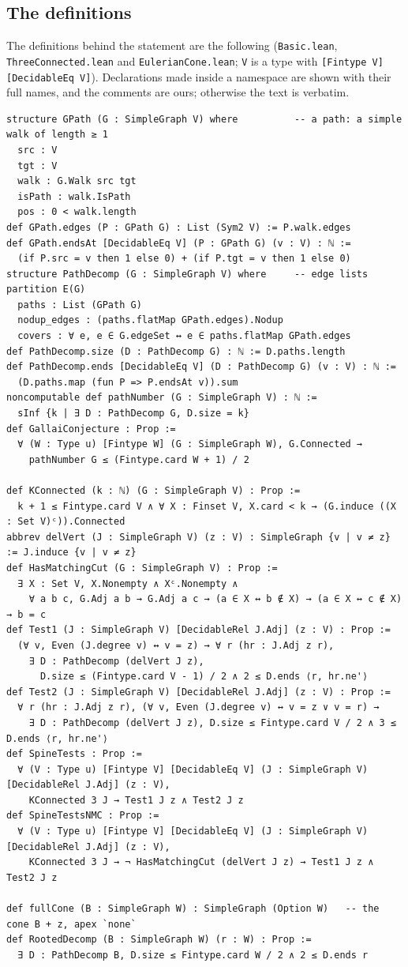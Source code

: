 \documentclass[11pt]{amsart}
\theoremstyle{definition}
\theoremstyle{remark}
\renewcommand{\_}{\oldunderscore\allowbreak}
\begin{document}
\subsection{The definitions}
The definitions behind the statement are the following (\texttt{Basic.lean},
\texttt{ThreeConnected.lean} and \texttt{EulerianCone.lean}; \texttt{V} is a type with
\texttt{[Fintype V] [DecidableEq V]}). Declarations made inside a namespace are shown with their
full names, and the comments are ours; otherwise the text is verbatim.
{\footnotesize
\begin{verbatim}
structure GPath (G : SimpleGraph V) where          -- a path: a simple walk of length ≥ 1
  src : V
  tgt : V
  walk : G.Walk src tgt
  isPath : walk.IsPath
  pos : 0 < walk.length
def GPath.edges (P : GPath G) : List (Sym2 V) := P.walk.edges
def GPath.endsAt [DecidableEq V] (P : GPath G) (v : V) : ℕ :=
  (if P.src = v then 1 else 0) + (if P.tgt = v then 1 else 0)
structure PathDecomp (G : SimpleGraph V) where     -- edge lists partition E(G)
  paths : List (GPath G)
  nodup_edges : (paths.flatMap GPath.edges).Nodup
  covers : ∀ e, e ∈ G.edgeSet ↔ e ∈ paths.flatMap GPath.edges
def PathDecomp.size (D : PathDecomp G) : ℕ := D.paths.length
def PathDecomp.ends [DecidableEq V] (D : PathDecomp G) (v : V) : ℕ :=
  (D.paths.map (fun P => P.endsAt v)).sum
noncomputable def pathNumber (G : SimpleGraph V) : ℕ :=
  sInf {k | ∃ D : PathDecomp G, D.size = k}
def GallaiConjecture : Prop :=
  ∀ (W : Type u) [Fintype W] (G : SimpleGraph W), G.Connected →
    pathNumber G ≤ (Fintype.card W + 1) / 2

def KConnected (k : ℕ) (G : SimpleGraph V) : Prop :=
  k + 1 ≤ Fintype.card V ∧ ∀ X : Finset V, X.card < k → (G.induce ((X : Set V)ᶜ)).Connected
abbrev delVert (J : SimpleGraph V) (z : V) : SimpleGraph {v | v ≠ z} := J.induce {v | v ≠ z}
def HasMatchingCut (G : SimpleGraph V) : Prop :=
  ∃ X : Set V, X.Nonempty ∧ Xᶜ.Nonempty ∧
    ∀ a b c, G.Adj a b → G.Adj a c → (a ∈ X ↔ b ∉ X) → (a ∈ X ↔ c ∉ X) → b = c
def Test1 (J : SimpleGraph V) [DecidableRel J.Adj] (z : V) : Prop :=
  (∀ v, Even (J.degree v) ↔ v = z) → ∀ r (hr : J.Adj z r),
    ∃ D : PathDecomp (delVert J z),
      D.size ≤ (Fintype.card V - 1) / 2 ∧ 2 ≤ D.ends ⟨r, hr.ne'⟩
def Test2 (J : SimpleGraph V) [DecidableRel J.Adj] (z : V) : Prop :=
  ∀ r (hr : J.Adj z r), (∀ v, Even (J.degree v) ↔ v = z ∨ v = r) →
    ∃ D : PathDecomp (delVert J z), D.size ≤ Fintype.card V / 2 ∧ 3 ≤ D.ends ⟨r, hr.ne'⟩
def SpineTests : Prop :=
  ∀ (V : Type u) [Fintype V] [DecidableEq V] (J : SimpleGraph V) [DecidableRel J.Adj] (z : V),
    KConnected 3 J → Test1 J z ∧ Test2 J z
def SpineTestsNMC : Prop :=
  ∀ (V : Type u) [Fintype V] [DecidableEq V] (J : SimpleGraph V) [DecidableRel J.Adj] (z : V),
    KConnected 3 J → ¬ HasMatchingCut (delVert J z) → Test1 J z ∧ Test2 J z

def fullCone (B : SimpleGraph W) : SimpleGraph (Option W)   -- the cone B + z, apex `none`
def RootedDecomp (B : SimpleGraph W) (r : W) : Prop :=
  ∃ D : PathDecomp B, D.size ≤ Fintype.card W / 2 ∧ 2 ≤ D.ends r
\end{verbatim}
}
\end{document}
